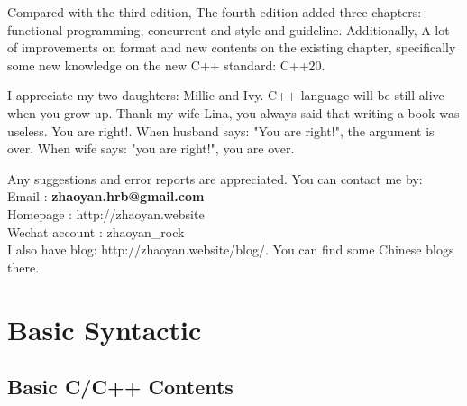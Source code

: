 \documentclass[a4paper,11pt,twoside]{book}
\begin{document}
\medskip

Compared with the third edition, The fourth edition added three chapters: functional programming, concurrent and style and guideline. Additionally, A lot of improvements on format and new contents on the existing chapter, specifically some new knowledge on the new C++ standard: C++20. \medskip  


I appreciate my two daughters: Millie and Ivy. C++ language will be still alive when you grow up.  Thank my wife Lina, you always said that writing a book was useless. You are right!. When husband says: "You are right!", the argument is over. When wife says: "you are right!", you are over. \par \par \medskip


Any suggestions and error reports are appreciated. You can contact me by: \\
Email          : \textbf{zhaoyan.hrb@gmail.com}  \\ 
Homepage       : http://zhaoyan.website  \\ 
Wechat account : zhaoyan\_rock   \\ 

I also have blog: http://zhaoyan.website/blog/. You can find some Chinese blogs there. 


\chapter{Basic Syntactic}

\section{Basic C/C++ Contents}
\end{document}
